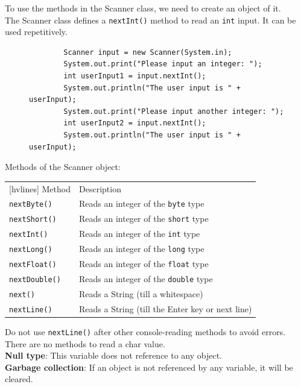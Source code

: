 \documentclass{article}
\begin{document}
To use the methods in the Scanner class, we need to create an object of it.\\
The Scanner class defines a \texttt{nextInt()} method to read an \texttt{int} input. It can be used repetitively.

\begin{figure}[h!]
	\centering
	\begin{verbatim}
		Scanner input = new Scanner(System.in);
		System.out.print("Please input an integer: ");
		int userInput1 = input.nextInt();
		System.out.println("The user input is " + userInput);
		System.out.print("Please input another integer: ");
		int userInput2 = input.nextInt();
		System.out.println("The user input is " + userInput);
	\end{verbatim}
\end{figure}

Methods of the Scanner object:

\begin{table}[h!]
	\centering
	\begin{NiceTabular}{||ll||}[hvlines]
		\RowStyle{\bfseries}Method & Description\\
		\texttt{nextByte()} & Reads an integer of the \texttt{byte} type\\
		\texttt{nextShort()} & Reads an integer of the \texttt{short} type\\
		\texttt{nextInt()} & Reads an integer of the \texttt{int} type\\
		\texttt{nextLong()} & Reads an integer of the \texttt{long} type\\
		\texttt{nextFloat()} & Reads an integer of the \texttt{float} type\\
		\texttt{nextDouble()} & Reads an integer of the \texttt{double} type\\
		\texttt{next()} & Reads a String (till a whitespace)\\
		\texttt{nextLine()} & Reads a String (till the Enter key or next line)
	\end{NiceTabular}
\end{table}

Do not use \texttt{nextLine()} after other console-reading methods to avoid errors.\\
There are no methods to read a char value.\\
\textbf{Null type}: This variable does not reference to any object.\\
\textbf{Garbage collection}: If an object is not referenced by any variable, it will be cleared.
\end{document}
